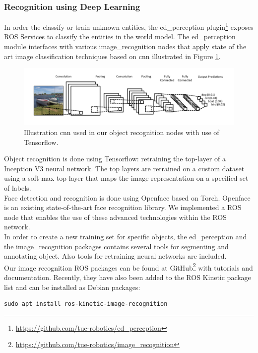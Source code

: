 \subsubsection{Recognition using Deep Learning}
In order the classify or train unknown entities, the ed\_perception plugin\footnote{\url{https://github.com/tue-robotics/ed_perception}} exposes ROS Services to classify the entities in the world model. The ed\_perception module interfaces with various image\_recognition nodes that apply state of the art image classification techniques based on \acrfull{cnn} illustrated in Figure \ref{fig:cnn}.
\begin{figure}[h]
    \centering
	\includegraphics[width = 1\linewidth]{Figures/cnn}
    \caption{Illustration \acrfull{cnn} used in our object recognition nodes with use of Tensorflow.}
	\label{fig:cnn}
\end{figure}
Object recognition is done using Tensorflow: retraining the top-layer of a Inception V3 neural network. The top layers are retrained on a custom dataset using a soft-max top-layer that maps the image representation on a specified set of labels.
\\
Face detection and recognition is done using Openface based on Torch. Openface is an existing state-of-the-art face recognition library. We implemented a ROS node that enables the use of these advanced technologies within the ROS network.
\\\newline
In order to create a new training set for specific objects, the ed\_perception and the image\_recognition packages contains several tools for segmenting and annotating object. Also tools for retraining neural networks are included.
\\
Our image recognition ROS packages can be found at GitHub\footnote{\url{https://github.com/tue-robotics/image_recognition}} with tutorials and documentation. Recently, they have also been added to the ROS Kinetic package list and can be installed as Debian packages:

\begin{lstlisting}
sudo apt install ros-kinetic-image-recognition
\end{lstlisting}